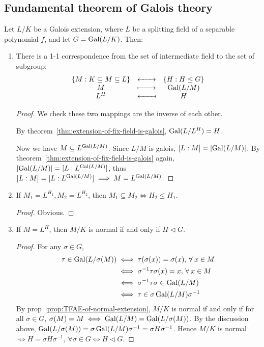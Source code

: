 \subsection{Fundamental theorem of Galois theory}
\begin{theorem}
  Let $L/K$ be a Galois extension, where $L$ be a splitting field of a separable polynomial $f$,
  and let $G = \operatorname{Gal}(L/K)$. Then:

  \begin{enumerate}[(\arabic*)]
    \item There is a 1-1 correspondence from the set of intermediate field to the set of subgroup:
      \[
        \begin{array}{ccc}
          \{ M : K \subseteq M \subseteq L \} & \xleftrightarrow{\quad\quad} & \{ H : H \leq G \} \\
          M & \xmapsto{\quad\quad} & \Gal(L/M) \\
          L^H & \reflectbox{\ensuremath{\xmapsto{\quad\quad}}} & H
        \end{array}
      \]

      \begin{proof}
        We check these two mappings are the inverse of each other.

        By theorem~\ref{thm:extension-of-fix-field-is-galois}, $\operatorname{Gal}(L/L^H) = H$.

        Now we have $M \subseteq L^{\operatorname{Gal}(L/M)}$. Since $L/M$ is galois, $[L: M] = \lvert\operatorname{Gal}(L/M)\rvert$.
        By theorem~\ref{thm:extension-of-fix-field-is-galois} again,
        $\lvert\operatorname{Gal}(L/M)\rvert = [L: L^{\operatorname{Gal}(L/M)}]$, thus $[L: M] = [L: L^{\operatorname{Gal}(L/M)}] \implies M = L^{\operatorname{Gal}(L/M)}$.
      \end{proof}

    \item If $M_1 = L^{H_1}, M_2 = L^{H_2}$, then $M_1 \subseteq M_2 \iff H_2 \leq H_1$.
      \begin{proof}
        Obvious.
      \end{proof}
    \item If $M = L^H$, then $M/K$ is normal if and only if $H \lhd G$.
    \begin{proof}
      For any $\sigma \in G$,
      \begin{align*}
        \tau \in \Gal(L/\sigma(M)) &\iff \tau(\sigma(x)) = \sigma(x), \, \forall x \in M \\
        &\iff \sigma^{-1} \tau \sigma(x) = x, \, \forall x \in M \\
        &\iff \sigma^{-1} \tau \sigma \in \Gal(L/M) \\
        &\iff \tau \in \sigma \Gal(L/M) \sigma^{-1}
      \end{align*}
      By prop~\ref{prop:TFAE-of-normal-extension}, $M/K$ is normal if and only if for all $\sigma \in G$,
      $\sigma(M) = M \iff \operatorname{Gal}(L/M) = \operatorname{Gal}(L/\sigma(M))$.
      By the discussion above, $\operatorname{Gal}(L/\sigma(M)) = \sigma \operatorname{Gal}(L/M) \sigma^{-1} = \sigma H \sigma^{-1}$.
      Hence $M/K$ is normal $\iff H = \sigma H \sigma^{-1},\, \forall \sigma \in G \iff H \lhd G$.
    \end{proof}


\end{enumerate}
\end{theorem}
